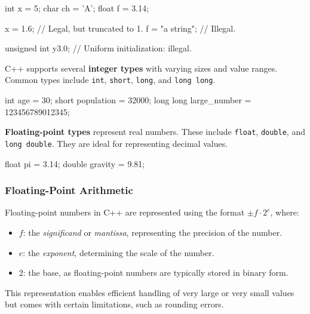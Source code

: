 \begin{exampleblock}
    \begin{codeblock}[language=C++]
int x = 5;
char ch = 'A';
float f = 3.14;

x = 1.6;        // Legal, but truncated to 1.
f = "a string"; // Illegal.

unsigned int y{3.0}; // Uniform initialization: illegal.
    \end{codeblock}
\end{exampleblock}

C++ supports several \textbf{integer types} with varying sizes and value ranges. Common types include \texttt{int}, \texttt{short}, \texttt{long}, and \texttt{long long}.

\begin{codeblock}[language=C++, numbers=none]
int age = 30;
short population = 32000;
long long large_number = 123456789012345;
\end{codeblock}

\textbf{Floating-point types} represent real numbers. These include \texttt{float}, \texttt{double}, and \texttt{long double}. They are ideal for representing decimal values.

\begin{codeblock}[language=C++, numbers=none]
float pi = 3.14;
double gravity = 9.81;
\end{codeblock}

\subsubsection{Floating-Point Arithmetic}

Floating-point numbers in C++ are represented using the format $\pm f \cdot 2^e$, where:
\begin{itemize}
    \item $f$: the \textit{significand} or \textit{mantissa}, representing the precision of the number.
    \item $e$: the \textit{exponent}, determining the scale of the number.
    \item $2$: the base, as floating-point numbers are typically stored in binary form.
\end{itemize}

This representation enables efficient handling of very large or very small values but comes with certain limitations, such as rounding errors.

